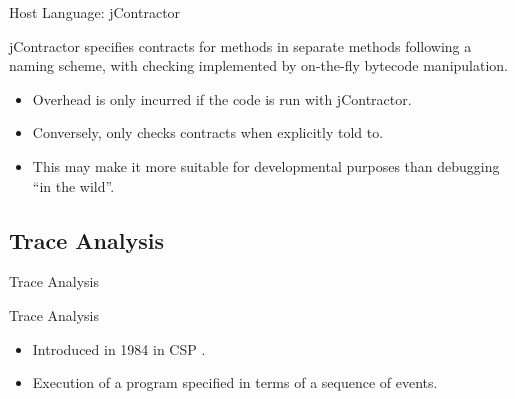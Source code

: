 \documentclass[12pt]{beamer}
\begin{document}
\begin{frame}{Host Language: \small jContractor \parencite{jcontractor}}

  jContractor specifies contracts for methods in separate methods
  following a naming scheme, with checking implemented by on-the-fly
  bytecode manipulation.

  \begin{itemize}
    \item Overhead is only incurred if the code is run with
      jContractor.

    \item Conversely, only checks contracts when explicitly told to.

    \item This may make it more suitable for developmental purposes
      than debugging ``in the wild''.
  \end{itemize}
\end{frame}


\subsection{Trace Analysis}
\label{sec:runver-trace}

\begin{frame}
  \begin{center}
    \Large Trace Analysis
  \end{center}
\end{frame}

\begin{frame}{Trace Analysis}


  \begin{itemize}
    \item Introduced in 1984 in CSP\footnotemark{} \parencite{cspthy}.
    \item Execution of a program specified in terms of a sequence of events.
  \end{itemize}


\end{frame}
\end{document}
